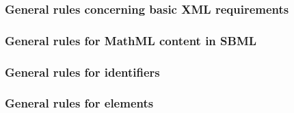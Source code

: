 \subsubsection*{General rules concerning basic XML requirements} \begin{sbmlenum}


\end{sbmlenum} \subsubsection*{General rules for MathML content in SBML} \begin{sbmlenum}


\begin{blockChanged}
\end{blockChanged}

\end{sbmlenum} \subsubsection*{General rules for identifiers}  \begin{sbmlenum}


\begin{blockChanged}
\end{blockChanged}

\end{sbmlenum} \subsubsection*{General rules for  elements} \begin{sbmlenum}


\end{sbmlenum}
